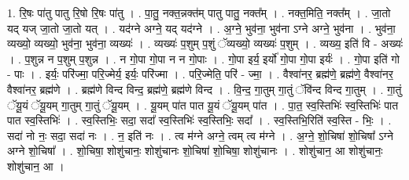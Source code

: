 \documentclass[17pt]{extarticle}
\begin{document}
1. रि॒षः पा॑तु पातु रि॒षो रि॒षः पा॑तु । . पा॒तु॒ नक्त॒न्नक्त॑म् पातु पातु॒ नक्त᳚म् । . नक्त॒मिति॒ नक्त᳚म् । . जा॒तो यद् यज् जा॒तो जा॒तो यत् । . यद॑ग्ने अग्ने॒ यद् यद॑ग्ने । . अ॒ग्ने॒ भुव॑ना॒ भुव॑ना ऽग्ने अग्ने॒ भुव॑ना । . भुव॑ना॒ व्यख्यो॒ व्यख्यो॒ भुव॑ना॒ भुव॑ना॒ व्यख्यः॑ । . व्यख्यः॑ प॒शुम् प॒शुं ॅव्यख्यो॒ व्यख्यः॑ प॒शुम् । . व्यख्य॒ इति॑ वि - अख्यः॑ । . प॒शुन्न न प॒शुम् प॒शुन्न । . न गो॒पा गो॒पा न न गो॒पाः । . गो॒पा इर्य॒ इर्यो॑ गो॒पा गो॒पा इर्यः॑ । . गो॒पा इति॑ गो - पाः । . इर्यः॒ परि॑ज्मा॒ परि॒ज्मेर्य॒ इर्यः॒ परि॑ज्मा । . परि॒ज्मेति॒ परि॑ - ज्मा॒ । . वैश्वा॑नर॒ ब्रह्म॑णे॒ ब्रह्म॑णे॒ वैश्वा॑नर॒ वैश्वा॑नर॒ ब्रह्म॑णे । . ब्रह्म॑णे विन्द विन्द॒ ब्रह्म॑णे॒ ब्रह्म॑णे विन्द । . वि॒न्द॒ गा॒तुम् गा॒तुं ॅवि॑न्द विन्द गा॒तुम् । . गा॒तुं ॅयू॒यं ॅयू॒यम् गा॒तुम् गा॒तुं ॅयू॒यम् । . यू॒यम् पा॑त पात यू॒यं ॅयू॒यम् पा॑त । . पा॒त॒ स्व॒स्तिभिः॑ स्व॒स्तिभिः॑ पात पात स्व॒स्तिभिः॑ । . स्व॒स्तिभिः॒ सदा॒ सदा᳚ स्व॒स्तिभिः॑ स्व॒स्तिभिः॒ सदा᳚ । . स्व॒स्तिभि॒रिति॑ स्व॒स्ति - भिः॒ । . सदा॑ नो नः॒ सदा॒ सदा॑ नः । . न॒ इति॑ नः । . त्व म॑ग्ने अग्ने॒ त्वम् त्व म॑ग्ने । . अ॒ग्ने॒ शो॒चिषा॑ शो॒चिषा᳚ ऽग्ने अग्ने शो॒चिषा᳚ । . शो॒चिषा॒ शोशु॑चानः॒ शोशु॑चानः शो॒चिषा॑ शो॒चिषा॒ शोशु॑चानः । . शोशु॑चान॒ आ शोशु॑चानः॒ शोशु॑चान॒ आ । \newline
\end{document}
